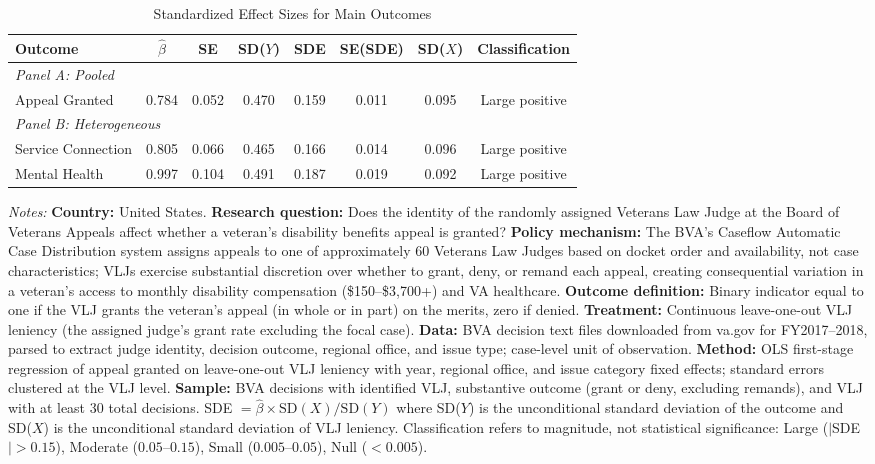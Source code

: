 
\begin{table}[H]
\centering
\caption{Standardized Effect Sizes for Main Outcomes}
\label{tab:sde}
\begin{threeparttable}
\begin{tabular}{lccccccc}
\toprule
Outcome & $\hat{\beta}$ & SE & SD($Y$) & SDE & SE(SDE) & SD($X$) & Classification \\
\midrule
\multicolumn{8}{l}{\textit{Panel A: Pooled}} \\[0.3em]
Appeal Granted & 0.784 & 0.052 & 0.470 & 0.159 & 0.011 & 0.095 & Large positive \\
\midrule
\multicolumn{8}{l}{\textit{Panel B: Heterogeneous}} \\[0.3em]
Service Connection & 0.805 & 0.066 & 0.465 & 0.166 & 0.014 & 0.096 & Large positive \\
Mental Health & 0.997 & 0.104 & 0.491 & 0.187 & 0.019 & 0.092 & Large positive \\
\bottomrule
\end{tabular}
\begin{tablenotes}[flushleft]
\footnotesize
\item \textit{Notes:} \textbf{Country:} United States. \textbf{Research question:} Does the identity of the randomly assigned Veterans Law Judge at the Board of Veterans Appeals affect whether a veteran's disability benefits appeal is granted? \textbf{Policy mechanism:} The BVA's Caseflow Automatic Case Distribution system assigns appeals to one of approximately 60 Veterans Law Judges based on docket order and availability, not case characteristics; VLJs exercise substantial discretion over whether to grant, deny, or remand each appeal, creating consequential variation in a veteran's access to monthly disability compensation (\$150--\$3,700+) and VA healthcare. \textbf{Outcome definition:} Binary indicator equal to one if the VLJ grants the veteran's appeal (in whole or in part) on the merits, zero if denied. \textbf{Treatment:} Continuous leave-one-out VLJ leniency (the assigned judge's grant rate excluding the focal case). \textbf{Data:} BVA decision text files downloaded from va.gov for FY2017--2018, parsed to extract judge identity, decision outcome, regional office, and issue type; case-level unit of observation. \textbf{Method:} OLS first-stage regression of appeal granted on leave-one-out VLJ leniency with year, regional office, and issue category fixed effects; standard errors clustered at the VLJ level. \textbf{Sample:} BVA decisions with identified VLJ, substantive outcome (grant or deny, excluding remands), and VLJ with at least 30 total decisions. SDE $= \hat{\beta} \times \text{SD}(X) / \text{SD}(Y)$ where SD($Y$) is the unconditional standard deviation of the outcome and SD($X$) is the unconditional standard deviation of VLJ leniency. Classification refers to magnitude, not statistical significance: Large ($|$SDE$| > 0.15$), Moderate ($0.05$--$0.15$), Small ($0.005$--$0.05$), Null ($< 0.005$).
\end{tablenotes}
\end{threeparttable}
\end{table}
